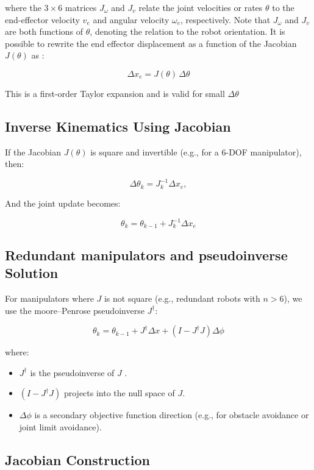 \documentclass[12pt]{article}
\begin{document}
where the $3\times6$ matrices $J_\omega$ and $J_v$ relate the joint velocities or rates $\theta$ to the end-effector velocity $v_e$ and angular velocity $\omega_e$, respectively. Note that $J_\omega$ and $J_v$ are both functions of $\theta$, denoting the relation to the robot orientation. It is possible to rewrite the end effector displacement as a function of the Jacobian $J(\theta)$ as \cite{ref19}:

  \[
    \Delta x_e = J(\theta) \, \Delta \theta 
  \]

This is a first-order Taylor expansion and is valid for small $\Delta \theta$

\subsection{Inverse Kinematics Using Jacobian}

If the Jacobian $J(\theta)$ is square and invertible (e.g., for a 6-DOF manipulator), then:\cite{ref19}

  \[
    \Delta \theta_k = J_k^{-1} \Delta x_e ,
  \]

And the joint update becomes:

  \[
    \theta_k = \theta_{k-1} + J_k^{-1} \Delta x_e  
  \]

\subsection{Redundant manipulators and pseudoinverse Solution}

For manipulators where $J$ is not square (e.g., redundant robots with $n > 6$), we use the moore–Penrose pseudoinverse $J^\dagger$:\cite{ref19}

  \[
    \theta_k = \theta_{k-1} + J^\dagger \Delta x + (I - J^\dagger J)\Delta \phi 
  \]

where:
\begin{itemize}
    \item $J^\dagger$ is the pseudoinverse of $J$ \cite{ref19}. 
    \item $(I - J^\dagger J)$ projects into the null space of $J$\cite{ref19}.
    \item $\Delta \phi$ is a secondary objective function direction (e.g., for obstacle avoidance or joint limit avoidance)\cite{ref19}.
\end{itemize}

\subsection{Jacobian Construction}
\end{document}
